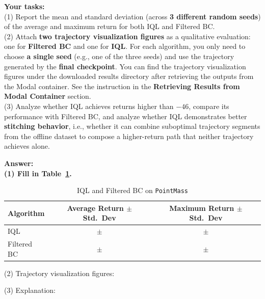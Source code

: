 \documentclass[12pt]{article}
\newcommand{\answer}[1]{{\bf \color{red}Answer:\\ #1}}
\begin{document}
\begin{enumerate}
\textbf{Your tasks:} \\
(1) Report the mean and standard deviation (across \textbf{3 different random seeds}) of the average and maximum return for both IQL and Filtered BC. \\
(2) Attach \textbf{two trajectory visualization figures} as a qualitative evaluation: one for \textbf{Filtered BC} and one for \textbf{IQL}. For each algorithm, you only need to choose \textbf{a single seed} (e.g., one of the three seeds) and use the trajectory generated by the \textbf{final checkpoint}. You can find the trajectory visualization figures under the downloaded results directory after retrieving the outputs from the Modal container. See the instruction in the \textbf{Retrieving Results from Modal Container} section. \\
(3) Analyze whether IQL achieves returns higher than $-46$, compare its performance with Filtered BC, and analyze whether IQL demonstrates better \textbf{stitching behavior}, i.e., whether it can combine suboptimal trajectory segments from the offline dataset to compose a higher-return path that neither trajectory achieves alone.

\answer{
(1) Fill in Table~\ref{table:stitching}.
\begin{table}[H]
  \centering
  \caption{IQL and Filtered BC on \texttt{PointMass}}
  \vspace{3pt}
  \label{table:stitching}
  \begin{tabular}{|l|c|c|}
    \toprule
    Algorithm & Average Return $\pm$ Std.\ Dev & Maximum Return $\pm$ Std.\ Dev \\
    \midrule
     IQL & $\pm$ & $\pm$ \\
     Filtered BC & $\pm$ & $\pm$ \\
    \bottomrule
  \end{tabular}
\end{table}
 
(2) Trajectory visualization figures:
 
(3) Explanation:
}



\end{enumerate}
\end{document}

